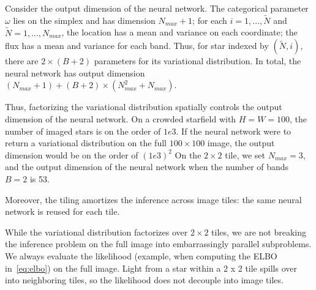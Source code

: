 Consider the output dimension of the neural network. The categorical parameter $\omega$ lies on the 
simplex and has dimension $N_{max} + 1$; for each $i = 1, ..., \tilde N$ and $\tilde N = 1, ..., N_{max}$, the location has a mean and variance on each coordinate; the flux has a mean and variance for each band. Thus, for star indexed by $(\tilde N, i)$, 
there are $2 \times (B + 2)$ parameters for its variational distribution. In total, the neural network has output dimension $(N_{max} + 1) + (B + 2) \times (N_{max}^2 + N_{max})$. 


Thus, factorizing the variational distribution spatially controls the output dimension of the neural network. On a crowded starfield with $H = W = 100$, the number of imaged stars is on the order of $1e3$. If the neural network were to return a variational distribution on the full $100\times 100$ image, the output dimension would be on the order of $(1e3)^2$
On the $2\times 2$ tile, we set $N_{max} = 3$, and the output dimension of the neural network when the number of bands $B = 2$ is 
53. 

Moreover, the tiling amortizes the inference across image tiles: the same neural network is reused for each tile. 

While the variational distribution factorizes over $2 \times 2$ tiles, we are not breaking the inference problem on the full image into embarrassingly parallel subproblems. We always evaluate the likelihood (example, when computing the ELBO in~\eqref{eq:elbo}) on the full image. Light from a star within a 2 x 2 tile spills over into neighboring tiles, so the likelihood does not decouple into image tiles. 
